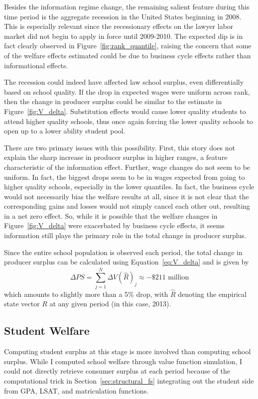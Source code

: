 \documentclass[12pt]{article}
\theoremstyle{definition}
\begin{document}
Besides the information regime change, the remaining salient feature during this time period is the aggregate recession in the United States beginning in 2008. This is especially relevant since the recessionary effects on the lawyer labor market did not begin to apply in force until 2009-2010. The expected dip is in fact clearly observed in Figure~\ref{fig:rank_quantile}, raising the concern that some of the welfare effects estimated could be due to business cycle effects rather than informational effects.

The recession could indeed have affected law school surplus, even differentially based on school quality. If the drop in expected wages were uniform across rank, then the change in producer surplus could be similar to the estimate in Figure~\ref{fig:V_delta}. Substitution effects would cause lower quality students to attend higher quality schools, thus once again forcing the lower quality schools to open up to a lower ability student pool.

There are two primary issues with this possibility. First, this story does not explain the sharp increase in producer surplus in higher ranges, a feature characteristic of the information effect. Further, wage changes do not seem to be uniform. In fact, the biggest drops seem to be in wages expected from going to higher quality schools, especially in the lower quantiles. In fact, the business cycle would not necessarily bias the welfare results at all, since it is not clear that the corresponding gains and losses would not simply cancel each other out, resulting in a net zero effect. So, while it is possible that the welfare changes in Figure~\ref{fig:V_delta} were exacerbated by business cycle effects, it seems information still plays the primary role in the total change in producer surplus. 

Since the entire school population is observed each period, the total change in producer surplus can be calculated using Equation~\eqref{eq:V_delta} and is given by
\begin{equation}
  \Delta PS = \sum_{j=1}^{\overline{N}}\Delta V(\hat{R})_j \approx -\$211 \text{ million}
  \label{eq:welfare_change_schools}
\end{equation}
which amounts to slightly more than a 5\% drop, with $\hat{R}$ denoting the empirical state vector $R$ at any given period (in this case, 2013).

\subsection{Student Welfare}
\label{sec:welfare_student}
Computing student surplus at this stage is more involved than computing school surplus. While I computed school welfare through value function simulation, I could not directly retrieve consumer surplus at each period because of the computational trick in Section~\ref{sec:structural_fs} integrating out the student side from GPA, LSAT, and matriculation functions.
\end{document}
